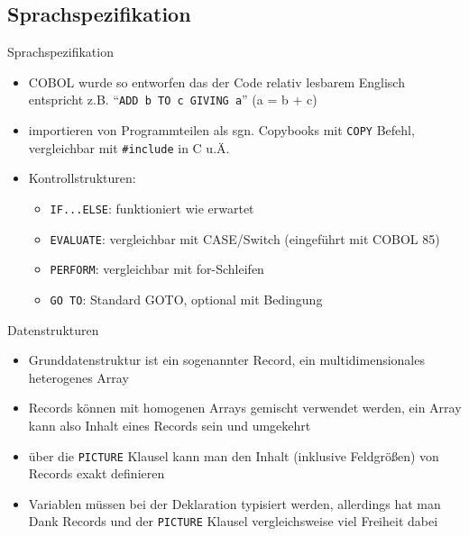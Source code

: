 \documentclass{beamer}
\begin{document}
\subsection{Sprachspezifikation}
\begin{frame}{Sprachspezifikation}
	\begin{itemize}[<+->]
		\item
			COBOL wurde so entworfen das der Code relativ lesbarem Englisch entspricht z.B. ``\texttt{ADD b TO c GIVING a}'' (a = b + c)
		\item
			importieren von Programmteilen als sgn. Copybooks mit \texttt{COPY} Befehl, vergleichbar mit \texttt{\#include} in C u.\"A.
		\item
			Kontrollstrukturen:
			\begin{itemize}[<+->]
				\item \texttt{IF...ELSE}: funktioniert wie erwartet
				\item \texttt{EVALUATE}: vergleichbar mit CASE/Switch (eingeführt mit COBOL 85)
				\item \texttt{PERFORM}: vergleichbar mit for-Schleifen
				\item \texttt{GO TO}: Standard GOTO, optional mit Bedingung
			\end{itemize}
	\end{itemize}
\end{frame}

\begin{frame}{Datenstrukturen}
	\begin{itemize}[<+->]
		\item
			Grunddatenstruktur ist ein sogenannter Record, ein multidimensionales heterogenes Array
		\item
			Records k\"onnen mit homogenen Arrays gemischt verwendet werden, ein Array kann also Inhalt eines Records sein und umgekehrt
		\item
			über die \texttt{PICTURE} Klausel kann man den Inhalt (inklusive Feldgrößen) von Records exakt definieren
		\item
			Variablen müssen bei der Deklaration typisiert werden, allerdings hat man Dank Records und der \texttt{PICTURE} Klausel vergleichsweise viel Freiheit dabei
	\end{itemize}
\end{frame}
\end{document}
